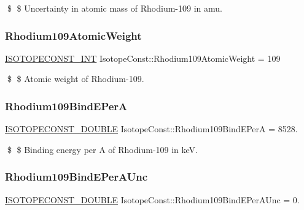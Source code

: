 \$ \$ Uncertainty in atomic mass of Rhodium-\/109 in amu. \mbox{\label{group___isotope_const-_rhodium-_rh109_ga7203d92ac018bbbecd10bbc98426f140}} 
\subsubsection{\texorpdfstring{Rhodium109\+Atomic\+Weight}{Rhodium109AtomicWeight}}
{\footnotesize\ttfamily \mbox{\hyperlink{group___isotope_const-_macros_ga5f18360b3e99483a35c32d789e62621c}{I\+S\+O\+T\+O\+P\+E\+C\+O\+N\+S\+T\+\_\+\+I\+NT}} Isotope\+Const\+::\+Rhodium109\+Atomic\+Weight = 109}

\$ \$ Atomic weight of Rhodium-\/109. \mbox{\label{group___isotope_const-_rhodium-_rh109_ga457e055efc22634bbfb6f02d2c930279}} 
\subsubsection{\texorpdfstring{Rhodium109\+Bind\+E\+PerA}{Rhodium109BindEPerA}}
{\footnotesize\ttfamily \mbox{\hyperlink{group___isotope_const-_macros_ga8f45a7272ce02c0b4c65c44636ed719a}{I\+S\+O\+T\+O\+P\+E\+C\+O\+N\+S\+T\+\_\+\+D\+O\+U\+B\+LE}} Isotope\+Const\+::\+Rhodium109\+Bind\+E\+PerA = 8528.}

\$ \$ Binding energy per A of Rhodium-\/109 in keV. \mbox{\label{group___isotope_const-_rhodium-_rh109_ga195e71c9b6154da551be62f251e8465b}} 
\subsubsection{\texorpdfstring{Rhodium109\+Bind\+E\+Per\+A\+Unc}{Rhodium109BindEPerAUnc}}
{\footnotesize\ttfamily \mbox{\hyperlink{group___isotope_const-_macros_ga8f45a7272ce02c0b4c65c44636ed719a}{I\+S\+O\+T\+O\+P\+E\+C\+O\+N\+S\+T\+\_\+\+D\+O\+U\+B\+LE}} Isotope\+Const\+::\+Rhodium109\+Bind\+E\+Per\+A\+Unc = 0.}

